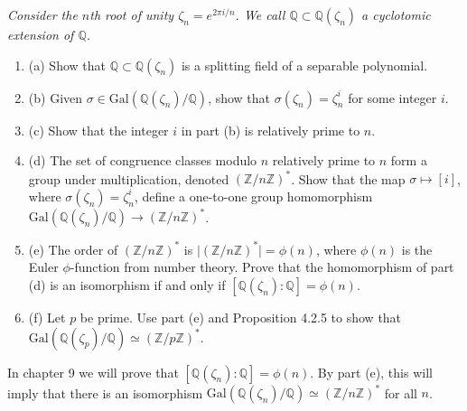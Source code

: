 \documentclass[11pt,a4paper]{article}
\newcommand{\be} {\begin{enumerate}}
\newcommand{\ee} {\end{enumerate}}
\newcommand{\Q}{\mathbb{Q}}
\newcommand{\Z}{\mathbb{Z}}
\newcommand{\Gal}{\mathrm{Gal}}
\begin{document}
{\it Consider the $n$th root of unity $\zeta_n = e^{2\pi i/n}$. We call $\Q \subset \Q(\zeta_n)$ a cyclotomic extension of $\Q$.
\be
\item[(a)]  Show that $\Q \subset \Q(\zeta_n)$ is a splitting field of a separable polynomial.
\item[(b)] Given $\sigma \in \Gal(\Q(\zeta_n)/\Q)$, show that $\sigma(\zeta_n) = \zeta_n^i$ for some integer $i$.
\item[(c)] Show that the integer $i$ in part (b) is relatively prime to $n$.
\item[(d)] The set of congruence classes modulo $n$ relatively prime to $n$ form a group under multiplication, denoted $(\Z/n\Z)^*$. Show that the map $\sigma \mapsto [i]$, where $\sigma(\zeta_n) = \zeta_n^i$, define a one-to-one group homomorphism $\Gal(\Q(\zeta_n)/\Q) \to (\Z/n\Z)^*$.
\item[(e)] The order of $(\Z/n\Z)^*$ is $\vert (\Z/n\Z)^* \vert = \phi(n)$, where $\phi(n)$ is the Euler $\phi$-function from number theory. Prove that the homomorphism of part (d) is an isomorphism if and only if $[\Q(\zeta_n) : \Q ] = \phi(n)$.
\item[(f)] Let $p$ be prime. Use part (e) and Proposition 4.2.5 to show that $\Gal(\Q(\zeta_p)/\Q) \simeq (\Z/p\Z)^*$.
\ee
In chapter 9 we will prove that $[\Q(\zeta_n):\Q] = \phi(n)$. By part (e), this will imply that there is an isomorphism $\Gal(\Q(\zeta_n)/\Q) \simeq (\Z/n\Z)^*$ for all $n$.
}
\end{document}
